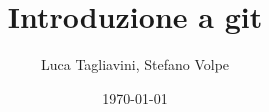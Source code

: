 \documentclass{beamer}
\title{Introduzione a git}
\author{Luca Tagliavini, Stefano Volpe}
\institute{Università di Bologna, corso di Laurea in Informatica}
\date{\today}
\begin{document}
\frame{\titlepage}
\end{document}
